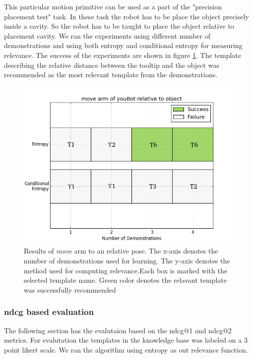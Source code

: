 This particular motion primitive can be used as a part of the "precision placement test" task. In these
task the robot has to be place the object precisely inside a cavity. So the robot has to be taught to place
the object relative to placement cavity.
We ran the experiments using different number of demonstrations and using both entropy 
and conditional entropy for measuring relevance. The success of the experiments are 
shown in figure \ref{arm relative results}. 
The template describing the relative distance between the tooltip and the object  was recommended as the most
relevant template from the demonstrations.
\begin{figure}[htp]
\centering
\includegraphics[scale=0.5]{images/arm_relative_result.png}
\caption[Result : \textit{move} arm relative pose to object]{Results of \textit{ move} arm to an relative pose. The x-axis denotes the 
number of demonstrations used for learning. The y-axis denotes the method used for 
computing relevance.Each
box is marked with the selected template name. Green color denotes the relavant template was successfully recommended}
\label{arm relative results}
\end{figure}

\FloatBarrier
\subsubsection{\acrlong{ndcg} based evaluation}
The following section has the evalutaion based on the \acrshort{ndcg}@1 
and \acrshort{ndcg}@2 metrics.
For evalutation the templates in the knowledge base was labeled on a 3 point
likert scale.
We ran the algorithm using entropy as out relevance function.

